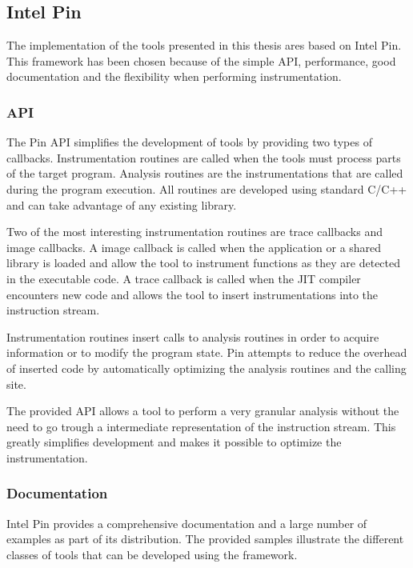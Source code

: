\subsection{Intel Pin}

The implementation of the tools presented in this thesis ares based on Intel Pin. This framework has been chosen because of the simple API, performance, good documentation and the flexibility when performing instrumentation.

\subsubsection{API}

The Pin API \cite{pindoc} simplifies the development of tools by providing two types of callbacks. Instrumentation routines are called when the tools must process parts of the target program. Analysis routines are the instrumentations that are called during the program execution. All routines are developed using standard C/C++ and can take advantage of any existing library.

Two of the most interesting instrumentation routines are trace callbacks and image callbacks. A image callback is called when the application or a shared library is loaded and allow the tool to instrument functions as they are detected in the executable code. A trace callback is called when the JIT compiler encounters new code and allows the tool to insert instrumentations into the instruction stream.

Instrumentation routines insert calls to analysis routines in order to acquire information or to modify the program state. Pin attempts to reduce the overhead of inserted code by automatically optimizing the analysis routines and the calling site.

The provided API allows a tool to perform a very granular analysis without the need to go trough a intermediate representation of the instruction stream. This greatly simplifies development and makes it possible to optimize the instrumentation.

\subsubsection{Documentation}

Intel Pin provides a comprehensive documentation \cite{pindoc} and a large number of examples as part of its distribution. The provided samples illustrate the different classes of tools that can be developed using the framework.

